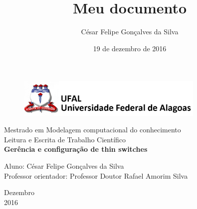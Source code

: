 \documentclass[12pt,a4paper]{article}
\title{Meu documento}
\author{César Felipe Gonçalves da Silva}
\date{19 de dezembro de 2016}
\begin{document}


\begin{titlepage}
	\begin{center}
	
	\begin{figure}[!ht]
	\centering
	\includegraphics[width=0.8\textwidth]{figuras/logo-ufal.png}
	\end{figure}

		\large{Mestrado em Modelagem computacional do conhecimento}\\ 
		\large{Leitura e Escrita de Trabalho Científico}\\ 
		\vspace{15pt}
        \vspace{95pt}
        \textbf{\LARGE{Gerência e configuração de thin switches}}\\
		\vspace{3,5cm}
	\end{center}
	
	\begin{flushleft}
		\begin{tabbing}
			Aluno: César Felipe Gonçalves da Silva\\
			Professor orientador: Professor Doutor Rafael Amorim Silva \\
			\end{tabbing}
 \end{flushleft}
	\vspace{1cm}
	
	\begin{center}
		\vspace{\fill}
			 Dezembro\\
		 2016
			\end{center}
\end{titlepage}
\end{document}
